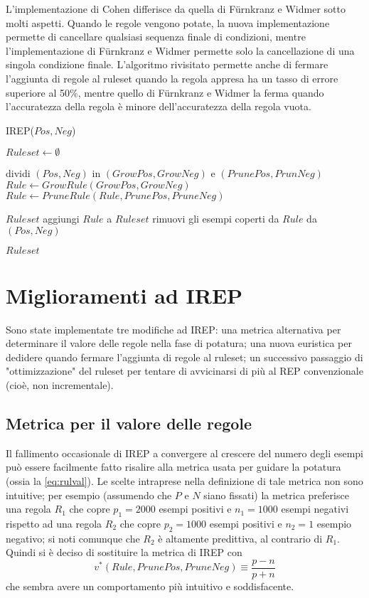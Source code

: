 L'implementazione di Cohen differisce da quella di Fürnkranz e Widmer sotto molti aspetti. Quando le regole vengono potate, la nuova implementazione permette di cancellare qualsiasi sequenza finale di condizioni, mentre l'implementazione di Fürnkranz e Widmer permette solo la cancellazione di una singola condizione finale. L'algoritmo rivisitato permette anche di fermare l'aggiunta di regole al ruleset quando la regola appresa ha un tasso di errore superiore al 50\%, mentre quello di Fürnkranz e Widmer la ferma quando l'accuratezza della regola è minore dell'accuratezza della regola vuota.

\begin{algorithm}[!htbp]
	\caption{IREP($Pos, Neg$)}
	\label{alg:irep}
	\begin{algorithmic}[1]
		\State $Ruleset \gets \emptyset$
		
		\State dividi $(Pos, Neg)$ in $(GrowPos, GrowNeg)$ e $(PrunePos, PrunNeg)$
		\State $Rule \gets GrowRule(GrowPos, GrowNeg)$
		\State $Rule \gets PruneRule(Rule, PrunePos, PruneNeg)$
		
		\State \Return $Ruleset$
		\Else
		\State aggiungi $Rule$ a $Ruleset$
		\State rimuovi gli esempi coperti da $Rule$ da $(Pos, Neg)$
		\EndIf
		\EndWhile
		
		\State \Return $Ruleset$
	\end{algorithmic}
\end{algorithm}

\pagebreak

\section{Miglioramenti ad IREP}
Sono state implementate tre modifiche ad IREP: una metrica alternativa per determinare il valore delle regole nella fase di potatura; una nuova euristica per dedidere quando fermare l'aggiunta di regole al ruleset; un successivo passaggio di "ottimizzazione" del ruleset per tentare di avvicinarsi di più al REP convenzionale (cioè, non incrementale).

\subsection*{Metrica per il valore delle regole}
Il fallimento occasionale di IREP a convergere al crescere del numero degli esempi può essere facilmente fatto risalire alla metrica usata per guidare la potatura (ossia la \eqref{eq:rulval}). Le scelte intraprese nella definizione di tale metrica non sono intuitive; per esempio (assumendo che $P$ e $N$ siano fissati) la metrica preferisce una regola $R_1$ che copre $p_1 = 2000$ esempi positivi e $n_1 = 1000$ esempi negativi rispetto ad una regola $R_2$ che copre $p_2 = 1000$ esempi positivi e $n_2 = 1$ esempio negativo; si noti comunque che $R_2$ è altamente predittiva, al contrario di $R_1$. Quindi si è deciso di sostituire la metrica di IREP con $$v^*(Rule, PrunePos, PruneNeg) \equiv \frac{p - n}{p + n}$$ che sembra avere un comportamento più intuitivo e soddisfacente.

